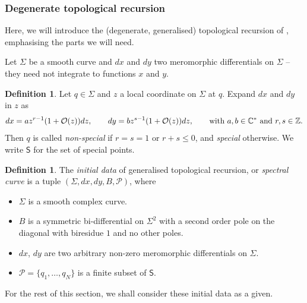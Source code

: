 \documentclass[10pt,a4paper,oneside,no-math,reqno]{amsart}%
\theoremstyle{plain}
\theoremstyle{definition}
\newtheorem{definition}[theorem]{Definition}
\theoremstyle{remark}
\numberwithin{equation}{section}
\newcommand{\mb}[1]{\mathbb{#1}}
\newcommand{\mc}[1]{\mathcal{#1}}
\newcommand{\1}{\mathds{1}}
\newcommand{\C}{\mb{C}}
\newcommand{\Z}{\mb{Z}}
\newcommand{\<}{\langle}
\renewcommand{\>}{\rangle}
\begin{document}
\subsubsection{Degenerate topological recursion}

Here, we will introduce the (degenerate, generalised) topological recursion of \cite{ABDKS25}, emphasising the parts we will need.

Let $ \Sigma$ be a smooth curve and $ dx$ and $ dy $ two meromorphic differentials on $ \Sigma $ -- they need not integrate to functions $ x$ and $ y$.

\begin{definition}\label{DefSpecialPoints}
    Let $ q \in \Sigma$ and $ z $ a local coordinate on $ \Sigma $ at $q$. Expand $ dx$ and $ dy $ in $z$ as
    \begin{equation}
        dx 
        =
        a z^{r-1} ( 1 + \mc{O}(z)) dz ,
        \qquad
        dy
        =
        b z^{s-1} (1 + \mc{O}(z)) dz,
        \qquad
        \text{with $ a, b \in \C^* $ and $ r, s \in \Z$.}
    \end{equation}
    Then $ q$ is called \emph{non-special} if $ r = s = 1$ or $ r + s \leq 0$, and \emph{special} otherwise. We write $ \mathsf{S} $ for the set of special points.
\end{definition}

\begin{definition}
    The \emph{initial data} of generalised topological recursion, or \emph{spectral curve} is a tuple $(	\Sigma, dx, dy, B, \mc{P})$, where
    \begin{itemize}
        \item $ \Sigma $ is a smooth complex curve.
        \item $B$ is a symmetric bi-differential on $\Sigma^2$ with a second order pole on the diagonal with biresidue $1$ and no other poles.
        \item $dx$, $dy$ are two arbitrary non-zero meromorphic differentials on $\Sigma$.
        \item $\mc{P} = \{q_1,\dotsc , q_N \}$ is a finite subset of $\mathsf{S}$.
    \end{itemize}
\end{definition}

For the rest of this section, we shall consider these initial data as a given.
\end{document}
